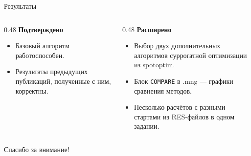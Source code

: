 \documentclass[10pt,aspectratio=169]{beamer}
\begin{document}
\begin{frame}{Результаты}
  \begin{columns}[T]
    \begin{column}{0.48\textwidth}
      \textbf{Подтверждено}
      \begin{itemize}\setlength{\itemsep}{1pt}
        \item Базовый алгоритм работоспособен.
        \item Результаты предыдущих публикаций, полученные с ним,
          корректны.
      \end{itemize}
    \end{column}
    \begin{column}{0.48\textwidth}
      \textbf{Расширено}
      \begin{itemize}\setlength{\itemsep}{1pt}
        \item Выбор двух дополнительных алгоритмов суррогатной оптимизации из spotoptim.
        \item Блок \texttt{COMPARE} в .mng --- графики сравнения методов.
        \item Несколько расчётов с разными стартами из RES-файлов
          в одном задании.
      \end{itemize}
    \end{column}
  \end{columns}
\end{frame}

\begin{frame}{}
  \centering\Large Спасибо за внимание!
\end{frame}
\end{document}
